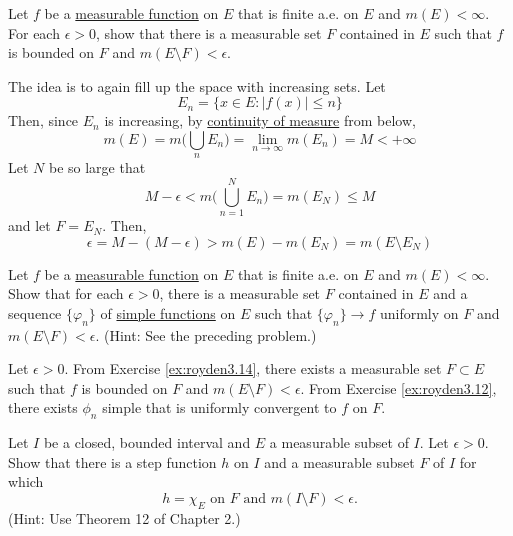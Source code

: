   \begin{exercise}[Royden 3.14][ex:royden3.14]
    Let $f$ be a \hyperref[def:measurable-function]{measurable function} on $E$ that is finite a.e. on $E$ and $m(E) < \infty$. For each $\epsilon > 0$, show that there is a measurable set $F$ contained in $E$ such that $f$ is bounded on $F$ and $m(E \setminus F) < \epsilon$.
  \end{exercise}
  \begin{solution}
    The idea is to again fill up the space with increasing sets. Let 
    \begin{equation}
      E_n = \{x \in E \colon |f(x)| \leq n \}
    \end{equation}
    Then, since $E_n$ is increasing, by \hyperref[thm:continuity-of-measure]{continuity of measure} from below, 
    \begin{equation}
      m(E) = m \bigg( \bigcup_n E_n \bigg) = \lim_{n \to \infty} m(E_n) = M < +\infty
    \end{equation}
    Let $N$ be so large that 
    \begin{equation}
      M - \epsilon < m \bigg( \bigcup_{n=1}^N E_n \bigg) = m(E_N) \leq M
    \end{equation}
    and let $F = E_N$. Then, 
    \begin{equation}
      \epsilon = M - (M - \epsilon) > m(E) - m(E_N) = m(E \setminus E_N)
    \end{equation}
  \end{solution}

  \begin{exercise}[Royden 3.15]
    Let $f$ be a \hyperref[def:measurable-function]{measurable function} on $E$ that is finite a.e. on $E$ and $m(E) < \infty$. Show that for each $\epsilon > 0$, there is a measurable set $F$ contained in $E$ and a sequence $\{\varphi_n\}$ of \hyperref[def:simple-functions]{simple functions} on $E$ such that $\{\varphi_n\} \to f$ uniformly on $F$ and $m(E \setminus F) < \epsilon$. (Hint: See the preceding problem.)
  \end{exercise}
  \begin{solution}
    Let $\epsilon > 0$. From Exercise \ref{ex:royden3.14}, there exists a measurable set $F \subset E$  such that $f$ is bounded on $F$ and $m(E \setminus F) < \epsilon$. From Exercise \ref{ex:royden3.12}, there exists $\phi_n$ simple that is uniformly convergent to $f$ on $F$. 
  \end{solution}

  \begin{exercise}[Royden 3.16]
    Let $I$ be a closed, bounded interval and $E$ a measurable subset of $I$. Let $\epsilon > 0$. Show that there is a step function $h$ on $I$ and a measurable subset $F$ of $I$ for which
    \begin{equation*}
      h = \chi_E \text{ on } F \text{ and } m(I \setminus F) < \epsilon.
    \end{equation*}
    (Hint: Use Theorem 12 of Chapter 2.)
  \end{exercise}

